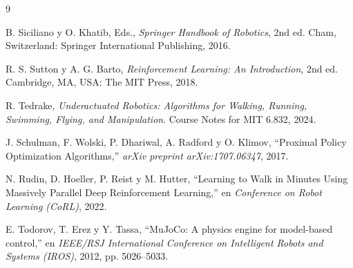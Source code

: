 \documentclass[12pt,a4paper]{article}
\begin{document}
\begin{thebibliography}{9}

B. Siciliano y O. Khatib, Eds., \textit{Springer Handbook of Robotics}, 2nd ed. Cham, Switzerland: Springer International Publishing, 2016.

R. S. Sutton y A. G. Barto, \textit{Reinforcement Learning: An Introduction}, 2nd ed. Cambridge, MA, USA: The MIT Press, 2018.

R. Tedrake, \textit{Underactuated Robotics: Algorithms for Walking, Running, Swimming, Flying, and Manipulation}. Course Notes for MIT 6.832, 2024.

J. Schulman, F. Wolski, P. Dhariwal, A. Radford y O. Klimov, ``Proximal Policy Optimization Algorithms,'' \textit{arXiv preprint arXiv:1707.06347}, 2017.

N. Rudin, D. Hoeller, P. Reist y M. Hutter, ``Learning to Walk in Minutes Using Massively Parallel Deep Reinforcement Learning,'' en \textit{Conference on Robot Learning (CoRL)}, 2022.

E. Todorov, T. Erez y Y. Tassa, ``MuJoCo: A physics engine for model-based control,'' en \textit{IEEE/RSJ International Conference on Intelligent Robots and Systems (IROS)}, 2012, pp. 5026--5033.

\end{thebibliography}

\newpage
\appendix
\end{document}

